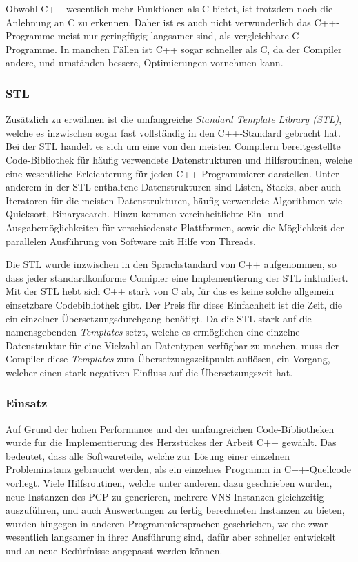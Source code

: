 Obwohl C++ wesentlich mehr Funktionen als C bietet, ist trotzdem noch die Anlehnung an C zu erkennen. Daher ist es auch nicht verwunderlich das C++-Programme meist nur geringfügig langsamer sind, als 
vergleichbare C-Programme. In manchen Fällen ist C++ sogar schneller als C, da der Compiler andere, und umständen bessere, Optimierungen vornehmen kann. 

\subsubsection{STL}
\label{sec:stl}
Zusätzlich zu erwähnen ist die umfangreiche \textit{Standard Template Library (STL)}, welche es inzwischen sogar fast vollständig in den 
C++-Standard gebracht hat. Bei der STL handelt es sich um eine von den meisten Compilern bereitgestellte Code-Bibliothek für häufig 
verwendete Datenstrukturen und Hilfsroutinen, welche eine wesentliche Erleichterung für jeden C++-Programmierer darstellen. Unter anderem
in der STL enthaltene Datenstrukturen sind Listen, Stacks, aber auch Iteratoren für die meisten Datenstrukturen, häufig verwendete Algorithmen
wie Quicksort, Binarysearch. Hinzu kommen vereinheitlichte Ein- und Ausgabemöglichkeiten für verschiedenste Plattformen, sowie die 
Möglichkeit der parallelen Ausführung von Software mit Hilfe von Threads.

Die STL wurde inzwischen in den Sprachstandard von C++ aufgenommen, so dass jeder standardkonforme Comipler eine Implementierung der STL inkludiert. Mit der STL hebt sich C++ stark von C ab, für 
das es keine solche allgemein einsetzbare Codebibliothek gibt. Der Preis für diese Einfachheit ist die Zeit, die ein einzelner Übersetzungsdurchgang benötigt. Da die STL stark auf die namensgebenden
\textit{Templates} setzt, welche es ermöglichen eine einzelne Datenstruktur für eine Vielzahl an Datentypen verfügbar zu machen, muss der Compiler diese \textit{Templates} zum Übersetzungszeitpunkt
auflösen, ein Vorgang, welcher einen stark negativen Einfluss auf die Übersetzungszeit hat.

\subsubsection{Einsatz}
Auf Grund der hohen Performance und der umfangreichen Code-Bibliotheken wurde für die Implementierung des Herzstückes der Arbeit C++ gewählt. Das bedeutet, dass alle Softwareteile, welche zur Lösung einer
einzelnen Probleminstanz gebraucht werden, als ein einzelnes Programm in C++-Quellcode vorliegt. Viele Hilfsroutinen, welche unter anderem dazu geschrieben wurden, neue Instanzen des PCP zu generieren, 
mehrere VNS-Instanzen gleichzeitig auszuführen, und auch Auswertungen zu fertig berechneten Instanzen zu bieten, wurden hingegen in anderen Programmiersprachen geschrieben, welche zwar wesentlich langsamer
in ihrer Ausführung sind, dafür aber schneller entwickelt und an neue Bedürfnisse angepasst werden können.

